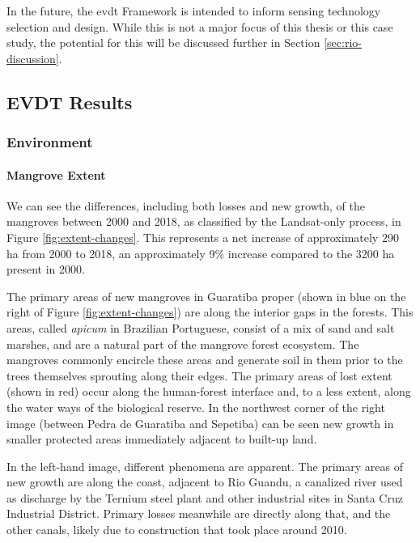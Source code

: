 In the future, the \ac{evdt} Framework is intended to inform sensing technology selection and design. While this is not a major focus of this thesis or this case study, the potential for this will be discussed further in Section \ref{sec:rio-discussion}.

\subsection{EVDT Results} \label{sec:rio-evdt-result}

\subsubsection{Environment} \label{sec:rio-evdt-e-result}


\paragraph{Mangrove Extent} \leavevmode\newline

We can see the differences, including both losses and new growth, of the mangroves between 2000 and 2018, as classified by the Landsat-only process, in Figure \ref{fig:extent-changes}. This represents a net increase of approximately 290 ha from 2000 to 2018, an approximately 9\% increase compared to the 3200 ha present in 2000.

The primary areas of new mangroves in Guaratiba proper (shown in blue on the right of Figure \ref{fig:extent-changes}) are along the interior gaps in the forests. This areas, called \textit{apicum} in Brazilian Portuguese, consist of a mix of sand and salt marshes, and are a natural part of the mangrove forest ecosystem. The mangroves commonly encircle these areas and generate soil in them prior to the trees themselves sprouting along their edges. The primary areas of lost extent (shown in red) occur along the human-forest interface and, to a less extent, along the water ways of the biological reserve. In the northwest corner of the right image (between Pedra de Guaratiba and Sepetiba) can be seen new growth in smaller protected areas immediately adjacent to built-up land.

In the left-hand image, different phenomena are apparent. The primary areas of new growth are along the coast, adjacent to Rio Guandu, a canalized river used as discharge by the Ternium steel plant and other industrial sites in Santa Cruz Industrial District. Primary losses meanwhile are directly along that, and the other canals, likely due to construction that took place around 2010. 
	
